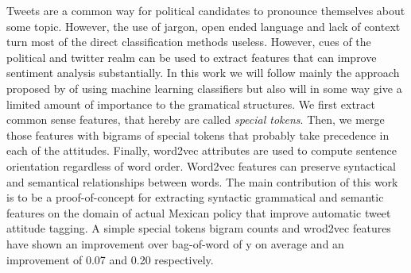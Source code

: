 Tweets are a common way for political candidates to pronounce themselves about some topic. However, the use of jargon, open ended language and lack of context turn most of the direct classification methods useless. However, cues of the political and twitter realm can be used to extract features that can improve sentiment analysis substantially. In this work we will follow mainly the approach proposed by \parencite{2002a} of using machine learning classifiers but also will in some way give a limited amount of importance to the gramatical structures. We first extract common sense features, that hereby are called \emph{special tokens}. Then, we merge those features with bigrams of special tokens that probably take precedence in each of the attitudes. Finally, word2vec attributes are used to compute sentence orientation regardless of word order. Word2vec features can preserve syntactical and semantical relationships between words. The main contribution of this work is to be a proof-of-concept for extracting syntactic grammatical and semantic features on the domain of actual Mexican policy that improve automatic tweet attitude tagging. A simple special tokens bigram counts and wrod2vec features have shown an improvement over bag-of-word of y on average and an improvement of 0.07 and 0.20 respectively.